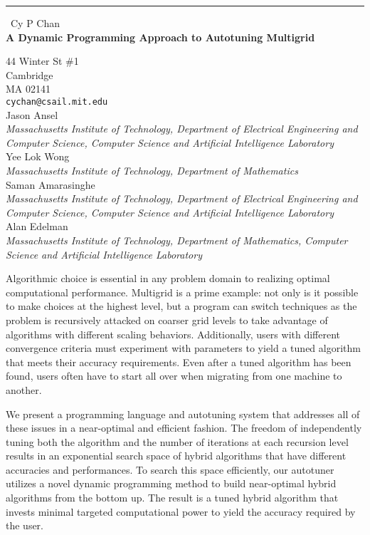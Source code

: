 \documentclass{report}
\begin{document}
\begin{center}
\rule{6in}{1pt} \
{\large Cy P Chan \\
{\bf A Dynamic Programming Approach to Autotuning Multigrid}}

44 Winter St \#1 \\ Cambridge \\ MA 02141
\\
{\tt cychan@csail.mit.edu}\\
Jason Ansel\\
{\em Massachusetts Institute of Technology, Department of Electrical Engineering and Computer Science, Computer Science and Artificial Intelligence Laboratory}\\
Yee Lok Wong\\
{\em Massachusetts Institute of Technology, Department of Mathematics}\\
Saman Amarasinghe\\
{\em Massachusetts Institute of Technology, Department of Electrical Engineering and Computer Science, Computer Science and Artificial Intelligence Laboratory}\\
Alan Edelman\\
{\em Massachusetts Institute of Technology, Department of Mathematics, Computer Science and Artificial Intelligence Laboratory}\end{center}

Algorithmic choice is essential in any problem domain to realizing
optimal computational performance. Multigrid is a prime example: not only
is it possible to make choices at the highest level, but a program can
switch techniques as the problem is recursively attacked on coarser grid
levels to take advantage of algorithms with different scaling behaviors.
Additionally, users with different convergence criteria must experiment
with parameters to yield a tuned algorithm that meets their accuracy
requirements. Even after a tuned algorithm has been found, users often
have to start all over when migrating from one machine to another.

We present a programming language and autotuning system that addresses all 
of these issues in a near-optimal and efficient fashion.
The freedom of
independently tuning both the algorithm and the number of iterations at
each recursion level results in an exponential search space of hybrid
algorithms that have different accuracies and performances. To search
this space efficiently, our autotuner utilizes a novel dynamic
programming method to build near-optimal hybrid algorithms from the
bottom up. The result is a tuned hybrid algorithm that invests minimal
targeted computational power to yield the accuracy required by the user.
\end{document}
